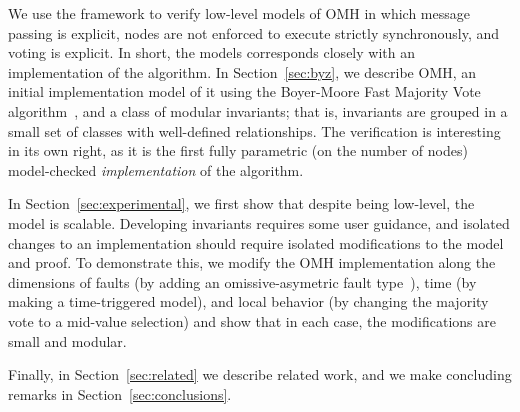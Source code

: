 \documentclass{llncs/llncs}
\newcommand{\OMH}{\ensuremath{\mathrm{OMH}}\xspace}
\begin{document}

We use the framework to verify low-level models of \OMH in which message passing is explicit, nodes are not enforced to execute strictly synchronously, and voting is explicit. In short, the models corresponds closely with an implementation of the algorithm. In Section~\ref{sec:byz}, we describe \OMH, an initial implementation model of it using the Boyer-Moore Fast Majority Vote algorithm~\cite{mjrty}, and a class of modular invariants; that is, invariants are grouped in a small set of classes with well-defined relationships. The verification is interesting in its own right, as it is the first fully parametric (on the number of nodes) model-checked \emph{implementation} of the algorithm.

In Section~\ref{sec:experimental}, we first show that despite being low-level, the model is scalable. Developing invariants requires some user guidance, and isolated changes to an implementation should require isolated modifications to the model and proof. To demonstrate this, we modify the \OMH implementation along the dimensions of faults (by adding an omissive-asymetric fault type~\cite{omissive}), time (by making a time-triggered model), and local behavior (by changing the majority vote to a mid-value selection) and show that in each case, the modifications are small and modular.

Finally, in Section~\ref{sec:related} we describe related work, and we make concluding remarks in Section~\ref{sec:conclusions}.


\end{document}
